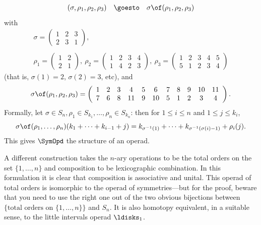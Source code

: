\begin{example}
\[\begin{array}{rcl}
(\sigma, \rho_1, \rho_2, \rho_3)	&\goesto&
\sigma \of (\rho_1, \rho_2, \rho_3)
\end{array}
\]
with
\[
\begin{array}{cc}
\sigma = 
\left(
\begin{array}{ccc}
1	&2	&3	\\
2	&3	&1	
\end{array}
\right),
\\ 
\ \\
\rho_1 = 
\left(
\begin{array}{cc}
1	&2	\\
2	&1	
\end{array}
\right),
\ 
\rho_2 = 
\left(
\begin{array}{cccc}
1	&2	&3	&4	\\
1	&4	&2	&3		
\end{array}
\right),
\ 
\rho_3 = 
\left(
\begin{array}{ccccc}
1	&2	&3	&4	&5	\\
5	&1	&2	&3	&4		
\end{array}
\right)
\end{array}
\]
(that is, $\sigma(1) = 2$, $\sigma(2) = 3$, etc), and
\[
\sigma\of(\rho_1, \rho_2, \rho_3)
=
\left(
\begin{array}{ccccccccccc}
1 &2 &3 &4 &5 &6 &7 &8 &9 &10&11\\
7 &6 &8 &11&9 &10&5 &1 &2 &3 &4
\end{array}
\right).
\]
Formally, let $\sigma\in S_n, \rho_1 \in S_{k_1}, \ldots, \rho_n \in
S_{k_n}$: then for $1\leq i\leq n$ and $1\leq j\leq k_i$, 
\[
\sigma\of(\rho_1, \ldots, \rho_n) (k_1 +\cdots + k_{i-1} + j)
=
k_{\sigma^{-1}(1)} + \cdots + k_{\sigma^{-1}(\sigma(i)-1)} + \rho_i(j).
\]
This gives $\SymOpd$ the structure of an operad.

A different construction takes the $n$-ary operations to be the total
orders%
%
%
on the set $\{1, \ldots, n\}$ and composition to be lexicographic
combination.  In this formulation it is clear that composition is
associative and unital.  This operad of total orders is isomorphic to the
operad of symmetries---but for the proof, beware that you need to use the
right one out of the two obvious bijections between $\{\textrm{total orders
on } \{1, \ldots, n\} \}$ and $S_n$.  It is also homotopy equivalent, in a
suitable sense, to the little intervals%
%
%
operad $\ldisks_1$.
\end{example}

